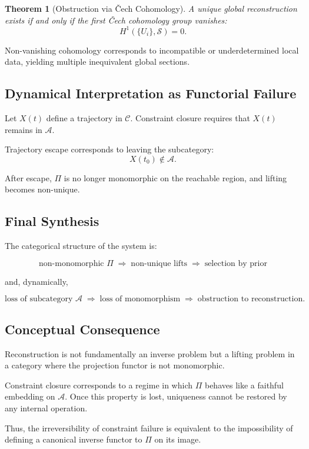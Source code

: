 \documentclass[12pt, oneside]{article}
\theoremstyle{plain}
\newtheorem{theorem}{Theorem}[section]
\theoremstyle{definition}
\theoremstyle{remark}
\begin{document}
\begin{theorem}[Obstruction via \v{C}ech Cohomology]
A unique global reconstruction exists if and only if the first \v{C}ech cohomology group vanishes:
\[
H^1(\{U_i\}, \mathcal{S}) = 0.
\]
\end{theorem}

Non-vanishing cohomology corresponds to incompatible or underdetermined local data, yielding multiple inequivalent global sections.

\subsection{Dynamical Interpretation as Functorial Failure}

Let $X(t)$ define a trajectory in $\mathcal{C}$. Constraint closure requires that $X(t)$ remains in $\mathcal{A}$.

Trajectory escape corresponds to leaving the subcategory:
\[
X(t_0) \notin \mathcal{A}.
\]

After escape, $\Pi$ is no longer monomorphic on the reachable region, and lifting becomes non-unique.

\subsection{Final Synthesis}

The categorical structure of the system is:

\[
\text{non-monomorphic } \Pi 
\;\Rightarrow\; \text{non-unique lifts}
\;\Rightarrow\; \text{selection by prior}
\]

and, dynamically,

\[
\text{loss of subcategory } \mathcal{A}
\;\Rightarrow\; \text{loss of monomorphism}
\;\Rightarrow\; \text{obstruction to reconstruction}.
\]

\subsection{Conceptual Consequence}

Reconstruction is not fundamentally an inverse problem but a lifting problem in a category where the projection functor is not monomorphic.

Constraint closure corresponds to a regime in which $\Pi$ behaves like a faithful embedding on $\mathcal{A}$. Once this property is lost, uniqueness cannot be restored by any internal operation.

Thus, the irreversibility of constraint failure is equivalent to the impossibility of defining a canonical inverse functor to $\Pi$ on its image.
\end{document}
